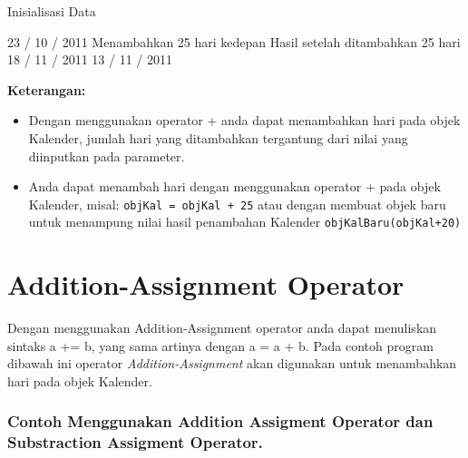 \begin{lcverbatim}
Inisialisasi Data

23 / 10 / 2011 Menambahkan 25 hari kedepan
Hasil setelah ditambahkan 25 hari 18 / 11 / 2011 
13 / 11 / 2011
\end{lcverbatim}

\textbf{Keterangan:}

\begin{itemize}

\item
  Dengan menggunakan operator + anda dapat menambahkan hari pada objek
  Kalender, jumlah hari yang ditambahkan tergantung dari nilai yang
  diinputkan pada parameter.
\item
  Anda dapat menambah hari dengan menggunakan operator + pada objek
  Kalender, misal: \texttt{objKal\ =\ objKal\ +\ 25} atau dengan membuat
  objek baru untuk menampung nilai hasil penambahan Kalender
  \texttt{objKalBaru(objKal+20)}
\end{itemize}

\section{Addition-Assignment
Operator}\label{addition-assignment-operator}

Dengan menggunakan Addition-Assignment operator anda dapat menuliskan
sintaks a += b, yang sama artinya dengan a = a + b. Pada contoh program
dibawah ini operator \emph{Addition-Assignment} akan digunakan untuk
menambahkan hari pada objek Kalender.

\subsubsection*{Contoh  Menggunakan Addition Assigment Operator dan Substraction Assigment Operator.}

